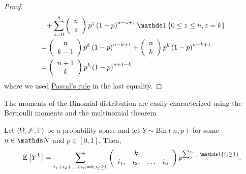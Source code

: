 \begin{proof}
\begin{align*}
 & \ \ \!\ +\sum_{z=0}^{n}\left(\begin{array}{c}
n\\
z
\end{array}\right)p^{z}\left(1-p\right)^{n-z+1}\indicate\left\{ 0\leq z\leq n,z=k\right\} \\
 & =\left(\begin{array}{c}
n\\
k-1
\end{array}\right)p^{k}\left(1-p\right)^{n-k+1}+\left(\begin{array}{c}
n\\
k
\end{array}\right)p^{k}\left(1-p\right)^{n-k+1}\\
 & =\left(\begin{array}{c}
n+1\\
k
\end{array}\right)p^{k}\left(1-p\right)^{n+1-k}
\end{align*}
 where we used \hyperref[prop:pascalRule]{Pascal's rule} in the last
equality.
\end{proof}
The moments of the Binomial distribution are easily characterized
using the Bernoulli moments and the multinomial theorem
\begin{prop}
\label{prop:momentsBinomial}Let $\left(\Omega,\mathcal{F},\mathbb{\mathbb{\mathbb{P}}}\right)$ be a probability
space and let $Y\sim\mathrm{Bin}\left(n,p\right)$ for some $n\in\N$
and $p\in\left[0,1\right]$. Then,
\[
\E\left[Y^{k}\right]=\sum_{i_{1}+i_{2}+\ldots+i_{n}=k,i_{j}\geq0}\left(\begin{array}{cccc}
 & k\\
i_{1}, & i_{2}, & \ldots & i_{n}
\end{array}\right)p^{\sum_{j=1}^{n}\indicate\left\{ i_{j}\geq1\right\} }.
\]
\end{prop}

